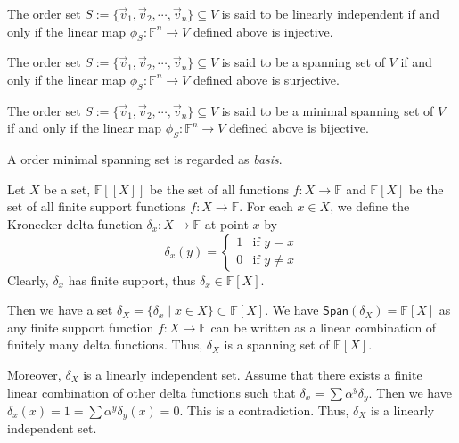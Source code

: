 \documentclass[
	11pt, %
	fleqn, %
	a4paper, %
]{LegrandOrangeBook}
\renewcommand{\span}[1]{\mathsf{Span}(#1)} %
\newcommand{\F}{\mathbb{F}} %
\begin{document}
\begin{proposition}
    The order set $S := \{\vec{v}_1, \vec{v}_2, \cdots, \vec{v}_n\} \subseteq V$ is said to be linearly independent if and only if the linear map $\phi_S: \F^n \to V$ defined above is injective.
\end{proposition}

\begin{proposition}
    The order set $S := \{\vec{v}_1, \vec{v}_2, \cdots, \vec{v}_n\} \subseteq V$ is said to be a spanning set of $V$ if and only if the linear map $\phi_S: \F^n \to V$ defined above is surjective.
\end{proposition}

\begin{proposition} \label{prop:minimal_spanning_set}
    The order set $S := \{\vec{v}_1, \vec{v}_2, \cdots, \vec{v}_n\} \subseteq V$ is said to be a minimal spanning set of $V$ if and only if the linear map $\phi_S: \F^n \to V$ defined above is bijective.
\end{proposition}
\begin{remark}
    A order minimal spanning set is regarded as \emph{basis}.
\end{remark}

\begin{example}
    Let $X$ be a set, $\F[[X]]$ be the set of all functions $f: X \to \F$ and $\F[X]$ be the set of all finite support functions $f: X \to \F$. For each $x \in X$, we define the Kronecker delta function $\delta_x : X \to \F$ at point $x$ by 
    \[
        \delta_x(y) = \begin{cases}
            1 & \text{if } y = x \\
            0 & \text{if } y \neq x
        \end{cases}
    \]
    Clearly, $\delta_x$ has finite support, thus $\delta_x \in \F[X]$.

    Then we have a set $\delta_X = \{\delta_x \mid x \in X\} \subset \F[X]$. We have $\span{\delta_X} = \F[X]$ as any finite support function $f: X \to \F$ can be written as a linear combination of finitely many delta functions. Thus, $\delta_X$ is a spanning set of $\F[X]$.

    Moreover, $\delta_X$ is a linearly independent set. Assume that there exists a finite linear combination of other delta functions such that $\delta_x = \sum \alpha^y \delta_{y}$. Then we have $\delta_x(x) = 1 = \sum \alpha^y \delta_y(x) = 0$. This is a contradiction. Thus, $\delta_X$ is a linearly independent set.
\end{example}
\end{document}
